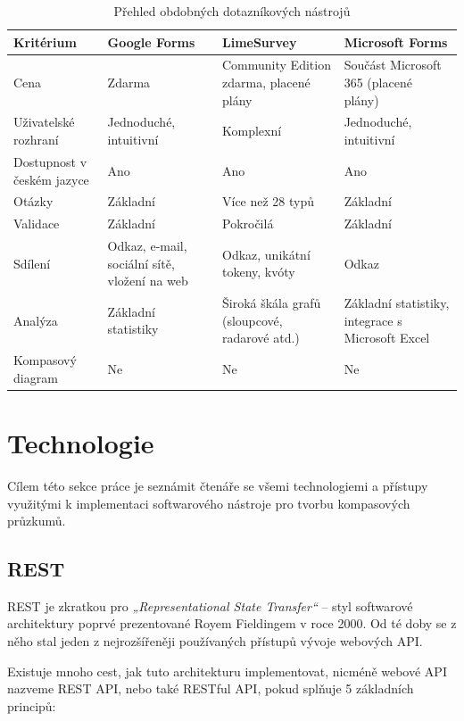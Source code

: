 \begin{table}[h!]
    \centering
    \renewcommand{\arraystretch}{1.2} %
    \begin{tabularx}{\textwidth}{|l|Y|Y|Y|}
        \hline
        \textbf{Kritérium} & \textbf{Google Forms} & \textbf{LimeSurvey} & \textbf{Microsoft Forms} \\ \hline
        Cena & Zdarma & Community Edition zdarma, placené plány & Součást Microsoft 365 (placené plány) \\ \hline
        Uživatelské rozhraní & Jednoduché, intuitivní & Komplexní & Jednoduché, intuitivní \\ \hline
        Dostupnost v českém jazyce & Ano & Ano & Ano \\ \hline
        Otázky & Základní & Více než 28 typů & Základní \\ \hline
        Validace & Základní & Pokročilá & Základní \\ \hline
        Sdílení & Odkaz, e-mail, sociální sítě, vložení na web & Odkaz, unikátní tokeny, kvóty & Odkaz \\ \hline
        Analýza & Základní statistiky & Široká škála grafů (sloupcové, radarové atd.) & Základní statistiky, integrace s Microsoft Excel \\ \hline
        Kompasový diagram & Ne & Ne & Ne \\ \hline
    \end{tabularx}
    \caption{Přehled obdobných dotazníkových nástrojů}
    \label{tab:similarsolutions}
\end{table}


\section{Technologie}
Cílem této sekce práce je seznámit čtenáře se všemi technologiemi a přístupy využitými k implementaci softwarového nástroje pro tvorbu kompasových průzkumů.

\subsection{REST}
REST je zkratkou pro \textit{„Representational State Transfer“} – styl softwarové architektury poprvé prezentované Royem Fieldingem v roce 2000. Od té doby se z něho stal jeden z nejrozšířeněji používaných přístupů vývoje webových API. 

Existuje mnoho cest, jak tuto architekturu implementovat, nicméně webové API nazveme REST API, nebo také RESTful API, pokud splňuje 5 základních principů:

